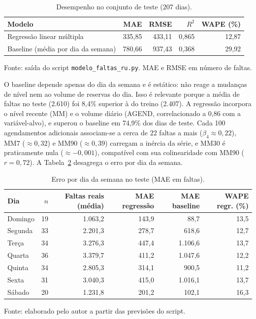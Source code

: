 \documentclass[11pt]{article}
\begin{document}
\begin{table}[htbp]
\centering
\small
\caption{Desempenho no conjunto de teste (207 dias).}
\label{tab:desempenho}
\begin{tabular}{@{}lrrrr@{}}
\toprule
Modelo & MAE & RMSE & $R^2$ & WAPE (\%) \\
\midrule
Regressão linear múltipla & 335,85 & 433,11 & 0,865 & 12,87 \\
Baseline (média por dia da semana) & 780,66 & 937,43 & 0,368 & 29,92 \\
\bottomrule
\end{tabular}
\begin{flushleft}\footnotesize Fonte: saída do script \texttt{modelo\_faltas\_ru.py}. MAE e RMSE em número de faltas.\end{flushleft}
\end{table}

O baseline depende apenas do dia da semana e é estático: não reage a mudanças de nível nem ao volume de reservas do dia. Isso é relevante porque a média de faltas no teste (2.610) foi 8,4\% superior à do treino (2.407). A regressão incorpora o nível recente (MM) e o volume diário (AGEND, correlacionado a 0,86 com a variável-alvo), e superou o baseline em 74,9\% dos dias de teste. Cada 100 agendamentos adicionais associam-se a cerca de 22 faltas a mais ($\beta_4\approx 0,22$), MM7 ($\approx 0,32$) e MM90 ($\approx 0,39$) carregam a inércia da série, e MM30 é praticamente nula ($\approx -0,001$), compatível com sua colinearidade com MM90 ($r=0,72$). A Tabela~\ref{tab:dias} desagrega o erro por dia da semana.

\begin{table}[htbp]
\centering
\scriptsize
\caption{Erro por dia da semana no teste (MAE em faltas).}
\label{tab:dias}
\begin{tabular}{@{}lrrrrr@{}}
\toprule
Dia & $n$ & Faltas reais (média) & MAE regressão & MAE baseline & WAPE regr. (\%) \\
\midrule
Domingo & 19 & 1.063,2 & 143,9 & 88,7 & 13,5 \\
Segunda & 33 & 2.201,3 & 278,7 & 618,6 & 12,7 \\
Terça & 34 & 3.276,3 & 447,4 & 1.106,6 & 13,7 \\
Quarta & 36 & 3.379,7 & 411,2 & 1.047,6 & 12,2 \\
Quinta & 34 & 2.805,3 & 314,1 & 900,5 & 11,2 \\
Sexta & 31 & 3.040,3 & 415,0 & 1.016,1 & 13,7 \\
Sábado & 20 & 1.231,8 & 201,2 & 102,1 & 16,3 \\
\bottomrule
\end{tabular}
\begin{flushleft}\footnotesize Fonte: elaborado pelo autor a partir das previsões do script.\end{flushleft}
\end{table}
\end{document}
